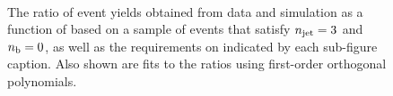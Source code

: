 \begin{figure}[h!]
\begin{center}
    \\
    \caption{The ratio of event yields obtained from data and simulation as a function of \mht [GeV] based on a sample of \mmj events that satisfy $n_{\text{jet}} = 3$ and $n_{\text{b}} = 0$, as well as the requirements on \scalht indicated by each sub-figure caption. Also shown are fits to the ratios using first-order orthogonal polynomials.}
    \label{fig:mhtval_MuMu_eq3j_eq0b}
  \end{center}
\end{figure}

